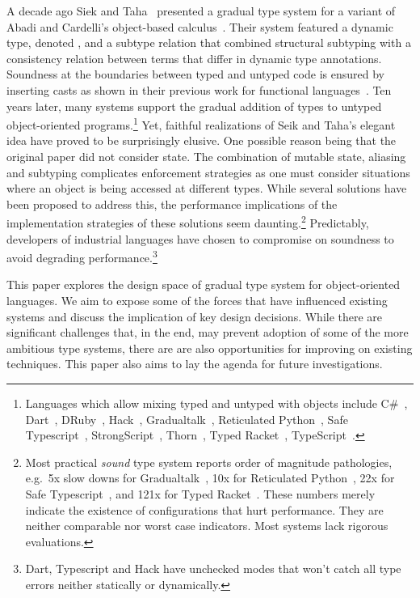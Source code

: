 \documentclass[a4paper,USenglish]{tex/lipics-v2016}
\begin{document}
\noindent
A decade ago Siek and Taha~\cite{SiekTaha07} presented a gradual type system
for a variant of Abadi and Cardelli's object-based
calculus~\cite{cardelli:1996:theory-of-objects}. Their system featured a
dynamic type, denoted \any, and a subtype relation that combined structural
subtyping with a consistency relation between terms that differ in dynamic
type annotations.  Soundness at the boundaries between typed and untyped
code is ensured by inserting casts as shown in their previous work for
functional languages~\cite{SiekTaha06}.  Ten years later, many systems
support the gradual addition of types to untyped object-oriented
programs.\footnote{Languages which allow mixing typed and untyped with
  objects include
C\#~\cite{Bierman10},
Dart~\cite{dart13}, 
DRuby~\cite{FurrAF2009},
Hack~\cite{hack13}, 
Gradualtalk~\cite{GS13},
Reticulated Python~\cite{siek14}, 
Safe Typescript~\cite{safe-typescript},
StrongScript~\cite{ecoop15}, 
Thorn~\cite{oopsla09}, 
Typed Racket~\cite{Takikawa:2012}, 
TypeScript~\cite{BAT14}.}
Yet, faithful realizations of Seik and Taha's elegant idea have proved to be
surprisingly elusive.  One possible reason being that the original paper did
not consider state.  The combination of mutable state, aliasing and
subtyping complicates enforcement strategies as one must consider situations
where an object is being accessed at different types. While several
solutions have been proposed to address this, the performance implications
of the implementation strategies of these solutions seem
daunting.\footnote{Most practical \emph{sound} type system reports order of
  magnitude pathologies, e.g.~5x slow downs for
  Gradualtalk~\cite{allende13}, 10x for Reticulated Python~\cite{siek14},
  22x for Safe Typescript~\cite{safe-typescript}, and 121x for Typed
  Racket~\cite{popl16}. These numbers merely indicate the existence of
  configurations that hurt performance.  They are neither comparable nor
  worst case indicators.  Most systems lack rigorous evaluations.  }
Predictably, developers of industrial languages have chosen to compromise on
soundness to avoid degrading performance.\footnote{Dart, Typescript and
  Hack have unchecked modes that won't catch all type errors neither statically
or dynamically.}

This paper explores the design space of gradual type system for
object-oriented languages. We aim to expose some of the forces that have
influenced existing systems and discuss the implication of key design
decisions. While there are significant challenges that, in the end, may
prevent adoption of some of the more ambitious type systems, there are are
also opportunities for improving on existing techniques.  This paper also
aims to lay the agenda for future investigations.
\end{document}
